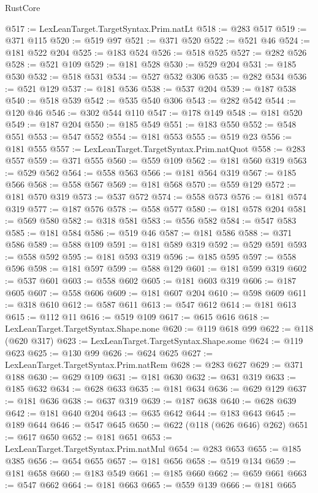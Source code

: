 \begin{lexlean}{RustCore}
\begin{coremodule}
@517 := LexLeanTarget.TargetSyntax.Prim.natLt
@518 := @283 @517
@519 := @371 @115
@520 := @519 @97
@521 := @371 @520
@522 := @521 @46
@524 := @181 @522 @204
@525 := @183 @524
@526 := @518 @525
@527 := @282 @526
@528 := @521 @109
@529 := @181 @528
@530 := @529 @204
@531 := @185 @530
@532 := @518 @531
@534 := @527 @532 @306
@535 := @282 @534
@536 := @521 @129
@537 := @181 @536
@538 := @537 @204
@539 := @187 @538
@540 := @518 @539
@542 := @535 @540 @306
@543 := @282 @542
@544 := @120 @46
@546 := @302 @544 @110
@547 := @178 @149
@548 := @181 @520
@549 := @187 @204
@550 := @185 @549
@551 := @183 @550
@552 := @548 @551
@553 := @547 @552
@554 := @181 @553
@555 := @519 @23
@556 := @181 @555
@557 := LexLeanTarget.TargetSyntax.Prim.natQuot
@558 := @283 @557
@559 := @371 @555
@560 := @559 @109
@562 := @181 @560 @319
@563 := @529 @562
@564 := @558 @563
@566 := @181 @564 @319
@567 := @185 @566
@568 := @558 @567
@569 := @181 @568
@570 := @559 @129
@572 := @181 @570 @319
@573 := @537 @572
@574 := @558 @573
@576 := @181 @574 @319
@577 := @187 @576
@578 := @558 @577
@580 := @181 @578 @204
@581 := @569 @580
@582 := @318 @581
@583 := @556 @582
@584 := @547 @583
@585 := @181 @584
@586 := @519 @46
@587 := @181 @586
@588 := @371 @586
@589 := @588 @109
@591 := @181 @589 @319
@592 := @529 @591
@593 := @558 @592
@595 := @181 @593 @319
@596 := @185 @595
@597 := @558 @596
@598 := @181 @597
@599 := @588 @129
@601 := @181 @599 @319
@602 := @537 @601
@603 := @558 @602
@605 := @181 @603 @319
@606 := @187 @605
@607 := @558 @606
@609 := @181 @607 @204
@610 := @598 @609
@611 := @318 @610
@612 := @587 @611
@613 := @547 @612
@614 := @181 @613
@615 := @112 @11
@616 := @519 @109
@617 := @615 @616
@618 := LexLeanTarget.TargetSyntax.Shape.none
@620 := @119 @618 @99
@622 := @118 (@620 @317)
@623 := LexLeanTarget.TargetSyntax.Shape.some
@624 := @119 @623
@625 := @130 @99
@626 := @624 @625
@627 := LexLeanTarget.TargetSyntax.Prim.natRem
@628 := @283 @627
@629 := @371 @188
@630 := @629 @109
@631 := @181 @630
@632 := @631 @319
@633 := @185 @632
@634 := @628 @633
@635 := @181 @634
@636 := @629 @129
@637 := @181 @636
@638 := @637 @319
@639 := @187 @638
@640 := @628 @639
@642 := @181 @640 @204
@643 := @635 @642
@644 := @183 @643
@645 := @189 @644
@646 := @547 @645
@650 := @622 (@118 (@626 @646) @262)
@651 := @617 @650
@652 := @181 @651
@653 := LexLeanTarget.TargetSyntax.Prim.natMul
@654 := @283 @653
@655 := @185 @385
@656 := @654 @655
@657 := @181 @656
@658 := @519 @134
@659 := @181 @658
@660 := @183 @549
@661 := @185 @660
@662 := @659 @661
@663 := @547 @662
@664 := @181 @663
@665 := @559 @139
@666 := @181 @665

\end{coremodule}
\end{lexlean}
